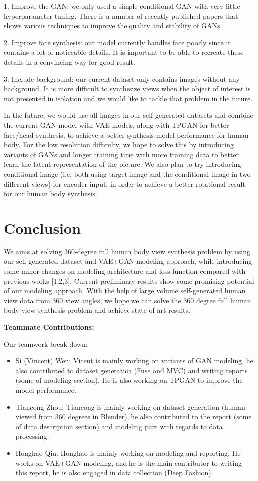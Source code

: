 \documentclass[10pt,conference]{IEEEtran}
\begin{document}
1. Improve the GAN: we only used a simple conditional GAN with very little hyperparameter tuning. There is a number of recently published papers that shows various techniques to improve the quality and stability of GANs.

2. Improve face synthesis: our model currently handles face poorly since it contains a lot of noticeable details. It is important to be able to recreate these details in a convincing way for good result. 

3. Include background: our current dataset only contains images without any background. It is more difficult to synthesize views when the object of interest is not presented in isolation and we would like to tackle that problem in the future.


In the future, we would use all images in our self-generated datasets and combine the current GAN model with VAE models, along with TPGAN for better face/head synthesis, to achieve a better synthesis model performance for human body. For the low resolution difficulty, we hope to solve this by introducing variants of GANs and longer training time with more training data to better learn the latent representation of the picture. We also plan to try introducing conditional image (i.e. both using target image and the conditional image in two different views) for encoder input, in order to achieve a better rotational result for our human body synthesis.


\section{Conclusion}
We aims at solving 360-degree full human body view synthesis problem by using our self-generated dataset and VAE+GAN modeling approach, while introducing some minor changes on modeling architecture and loss function compared with previous works [1,2,3].
Current preliminary results show some promising potential of our modeling approach. With the help of large volume self-generated human view data from 360 view angles, we hope we can solve the 360 degree full human body view synthesis problem and achieve state-of-art results.

\textbf{Teammate Contributions:}

Our teamwork break down:
\begin{itemize}
\item Si (Vincent) Wen: Vicent is mainly working on variants of GAN modeling, he also contributed to dataset generation (Fuse and MVC) and writing reports (some of modeling section). He is also working on TPGAN to improve the model performance.
\item Tiancong Zhou: Tiancong is mainly working on dataset generation (human viewed from 360 degrees in Blender), he also contributed to the report (some of data description section) and modeling part with regards to data processing.
\item Honghao Qiu: Honghao is mainly working on modeling and reporting. He works on VAE+GAN modeling, and he is the main contributor to writing this report, he is also engaged in data collection (Deep Fashion).
\end{itemize}
\end{document}
